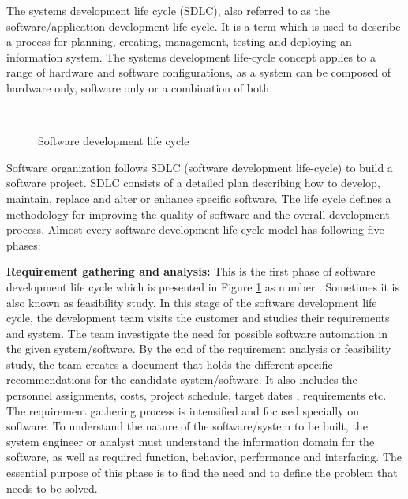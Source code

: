 The systems development life cycle (SDLC), also referred to as the software/application development life-cycle. It is a term which is used to describe a process for planning, creating, management, testing and deploying an information system. The systems development life-cycle concept applies to a range of hardware and software configurations, as a system can be composed of hardware only, software only or a combination of both.

\begin{figure}[htbp]
	\centering
	\\
	\vspace{-3em}
	\caption{Software development life cycle}
	\label{figure_sdlc}
\end{figure}

Software organization follows SDLC (software development life-cycle) to build a software project. SDLC consists of a detailed plan describing how to develop, maintain, replace and alter or enhance specific software. The life cycle defines a methodology for improving the quality of software and the overall development process. Almost every software development life cycle model has following five phases:

\textbf{ Requirement gathering and analysis:}
This is the first phase of software development life cycle which is presented in Figure \ref{figure_sdlc} as number . Sometimes it is also known as feasibility study. In this stage of the software development life cycle, the development team visits the customer and studies their requirements and system. The team investigate the need for possible software automation in the given system/software. By the end of the requirement analysis or feasibility study, the team creates a document that holds the different specific recommendations for the candidate system/software. It also includes the personnel assignments, costs, project schedule, target dates , requirements etc. The requirement gathering process is intensified and focused specially on software. To understand the nature of the software/system to be built, the system engineer or analyst must understand the information domain for the software, as well as required function, behavior, performance and interfacing. The essential purpose of this phase is to find the need and to define the problem that needs to be solved.

